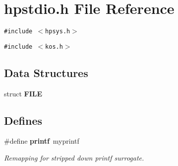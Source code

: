 \section{hpstdio.h File Reference}
\label{hpstdio_8h}
{\tt \#include $<$hpsys.h$>$}\par
{\tt \#include $<$kos.h$>$}\par
\subsection*{Data Structures}
\begin{CompactItemize}
\item 
struct {\bf FILE}
\end{CompactItemize}
\subsection*{Defines}
\begin{CompactItemize}
\item 
\#define {\bf printf}\ myprintf
\begin{CompactList}\small\item\em Remapping for stripped down printf surrogate.\item\end{CompactList}\end{CompactItemize}
